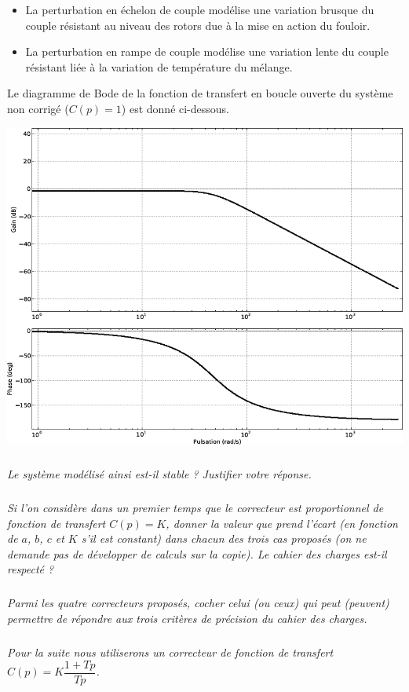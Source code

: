 \documentclass[10pt,fleqn]{article} %
\begin{document}
\begin{multicols}{2}
\begin{rem}
\begin{itemize}
\item La perturbation en échelon de couple modélise une variation brusque du couple résistant au niveau des rotors due à la mise en action du fouloir.
\item La perturbation en rampe de couple modélise une variation lente du couple résistant liée à la variation de température du mélange.
\end{itemize}
\end{rem}

Le diagramme de Bode de la fonction de transfert en boucle ouverte du système non corrigé ($C(p) = 1$) est donné ci-dessous.

\begin{center}
\includegraphics[width=.8\linewidth]{images/e3a_08.png}
\end{center}


\subparagraph{}
\textit{Le système modélisé ainsi est-il stable ? Justifier votre réponse.}

\subparagraph{}
\textit{Si l'on considère dans un premier temps que le correcteur est proportionnel de fonction de transfert $C(p) = K$, donner la valeur que prend l'écart (en fonction de $a$, $b$, $c$ et $K$ s’il est constant) dans chacun des trois cas proposés (on ne demande pas de développer de calculs sur la copie). Le cahier des charges est-il respecté ?}

\subparagraph{}
\textit{Parmi les quatre correcteurs proposés, cocher celui (ou ceux) qui peut (peuvent) permettre de répondre aux trois critères de précision du cahier des charges.}

\subparagraph{}
\textit{Pour la suite nous utiliserons un correcteur de fonction de transfert  $C(p)=K\dfrac{1+Tp}{Tp}$.}


\end{multicols}
\end{document}
